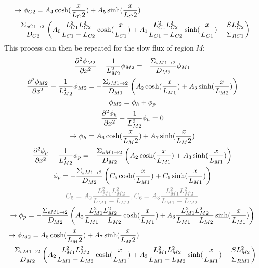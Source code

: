\documentclass[11pt]{article} %
\begin{document}
\begin{multline}
    \rightarrow\phi_{C2}=A_4\cosh(\frac{x}{L_C2}) + A_5\sinh(\frac{x}{L_C2})\hfill\\\hfill-\frac{\Sigma_{sC1\rightarrow2}}{D_{C2}}\left(A_0\frac{L_{C1}^2L_{C2}^2}{L_{C1}-L_{C2}}\cosh(\frac{x}{L_{C1}}) + A_1\frac{L_{C1}^2L_{C2}^2}{L_{C1}-L_{C2}}\sinh(\frac{x}{L_{C1}})-\frac{SL_{C2}^2}{\SigR{C1}}\right)
\label{eq:c2_flux}
\end{multline}
This process can then be repeated for the slow flux of region $M$:
\begin{equation}
    \begin{gathered}
        \pd{\phi_{M2}}{x}{2} - \frac{1}{L_{M2}^2}\phi_{M2} = -\frac{\Sigma_{sM1\rightarrow2}}{D_{M2}}\phi_{M1}\\
        \pd{\phi_{M2}}{x}{2} - \frac{1}{L_{M2}^2}\phi_{M2} = -\frac{\Sigma_{sM1\rightarrow2}}{D_{M1}}\left(A_2\cosh(\frac{x}{L_{M1}}) + A_3\sinh(\frac{x}{L_{M2}})\right)\\
        \phi_{M2} = \phi_h + \phi_p\\
        \pd{\phi_h}{x}{2} - \frac{1}{L_{M2}^2}\phi_h = 0\\
        \rightarrow\phi_h = A_6\cosh(\frac{x}{L_M2}) + A_7\sinh(\frac{x}{L_M2})\\
        \pd{\phi_p}{x}{2} - \frac{1}{L_{M2}^2}\phi_p = -\frac{\Sigma_{sM1\rightarrow2}}{D_{M2}}\left(A_2\cosh(\frac{x}{L_{M1}}) + A_3\sinh(\frac{x}{L_{M1}})\right)\\
        \phi_p = -\frac{\Sigma_{sM1\rightarrow2}}{D_{M2}}\left(C_5\cosh(\frac{x}{L_{M1}}) + C_6\sinh(\frac{x}{L_{M1}})\right)\\
        \color{gray}C_5=A_2\frac{L_{M1}^2L_{M2}^2}{L_{M1}-L_{M2}}, C_6=A_3\frac{L_{M1}^2L_{M2}^2}{L_{M1}-L_{M2}}\\
        \rightarrow\phi_p = -\frac{\Sigma_{sM1\rightarrow2}}{D_{M2}}\left(A_2\frac{L_{M1}^2L_{M2}^2}{L_{M1}-L_{M2}}\cosh(\frac{x}{L_{M1}}) + A_3\frac{L_{M1}^2L_{M2}^2}{L_{M1}-L_{M2}}\sinh(\frac{x}{L_{M1}})\right)\\
    \end{gathered}
\end{equation}
\begin{multline}
    \rightarrow\phi_{M2}=A_6\cosh(\frac{x}{L_M2}) + A_7\sinh(\frac{x}{L_M2})\hfill\\\hfill-\frac{\Sigma_{sM1\rightarrow2}}{D_{M2}}\left(A_2\frac{L_{M1}^2L_{M2}^2}{L_{M1}-L_{M2}}\cosh(\frac{x}{L_{M1}}) + A_3\frac{L_{M1}^2L_{M2}^2}{L_{M1}-L_{M2}}\sinh(\frac{x}{L_{M1}})-\frac{SL_{M2}^2}{\SigR{M1}}\right)
\label{eq:m2_flux}
\end{multline}
\end{document}
